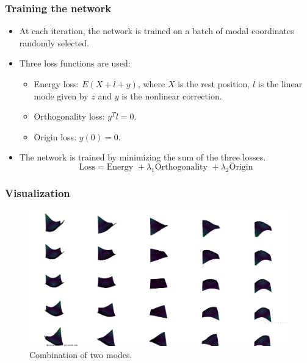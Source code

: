 \documentclass{beamer}
\begin{document}
\begin{frame}
    \frametitle{Training the network}
    \begin{itemize}
        \item At each iteration, the network is trained on a batch of modal coordinates randomly selected.
        \item Three loss functions are used:
        \begin{itemize}
            \item Energy loss: \( E(X + l + y)\), where \(X\) is the rest position, \(l\) is the linear mode given by \(z\) and \(y\) is the nonlinear correction.
            \item Orthogonality loss: \( y^T l = 0 \).
            \item Origin loss: \( y(0) = 0 \).
        \end{itemize}
        \item The network is trained by minimizing the sum of the three losses.
        \[
        \text{Loss} = \text{Energy } + \lambda_1 \text{Orthogonality } + \lambda_2 \text{Origin}
        \]
    \end{itemize}
\end{frame}

\begin{frame}
    \frametitle{Visualization}
    \begin{figure}
        \centering
        \includegraphics[width=\textwidth]{Images/2_modes.png}
        \caption{Combination of two modes.}
        \label{fig:2_modes}
    \end{figure}
\end{frame}
\end{document}
